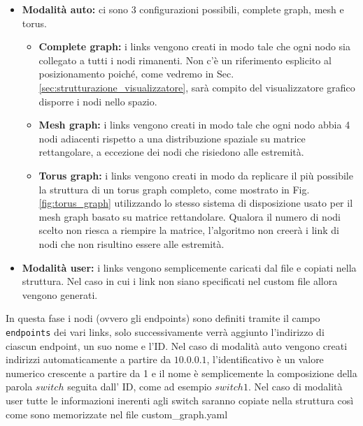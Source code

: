 \documentclass[binding=0.6cm]{sapthesis}
\begin{document}
\begin{itemize}
    \item \textbf{Modalità auto:} ci sono 3 configurazioni possibili, complete graph, mesh e torus.
    \begin{itemize}
        \item \textbf{Complete graph:} i links vengono creati in modo tale che ogni nodo sia collegato a tutti i nodi rimanenti. Non c'è un riferimento esplicito al posizionamento poiché, come vedremo in Sec. \ref{sec:strutturazione_visualizzatore}, sarà compito del visualizzatore grafico disporre i nodi nello spazio.
        \item \textbf{Mesh graph: } i links vengono creati in modo tale che ogni nodo abbia 4 nodi adiacenti rispetto a una distribuzione spaziale su matrice rettangolare, a eccezione dei nodi che risiedono alle estremità.
        \item \textbf{Torus graph: } i links vengono creati in modo da replicare il più possibile la struttura di un torus graph completo, come mostrato in Fig. \ref{fig:torus_graph} utilizzando lo stesso sistema di disposizione usato per il mesh graph basato su matrice rettandolare.
        Qualora il numero di nodi scelto non riesca a riempire la matrice, l'algoritmo non creerà i link di nodi che non risultino essere alle estremità.
    \end{itemize} 
    \item \textbf{Modalità user:} i links vengono semplicemente caricati dal file e copiati nella struttura. Nel caso in cui i link non siano specificati nel custom file allora vengono generati.
\end{itemize}
In questa fase i nodi (ovvero gli endpoints) sono definiti tramite il campo \texttt{endpoints} dei vari links, solo successivamente verrà aggiunto l'indirizzo di ciascun endpoint, un suo nome e l'ID.
Nel caso di modalità auto vengono creati indirizzi automaticamente a partire da \(10.0.0.1\), l'identificativo è un valore numerico crescente a partire da 1 e il nome è semplicemente la composizione
della parola \(switch\) seguita dall' ID, come ad esempio \(switch1\).
Nel caso di modalità user tutte le informazioni inerenti agli switch saranno copiate nella struttura così come sono memorizzate nel file custom\_graph.yaml
\end{document}
